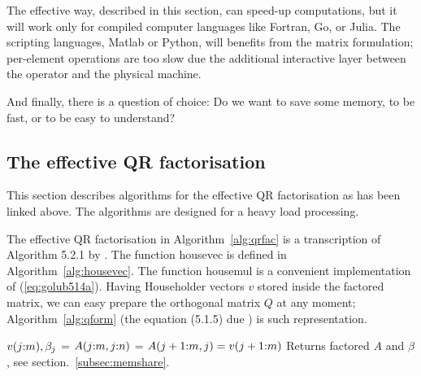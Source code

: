 \begin{refsection}
The effective way, described in this section, can speed-up
computations, but it will work only for compiled computer languages
like Fortran, Go, or Julia.
The scripting languages, Matlab or Python,
will benefits from the matrix formulation; per-element
operations are too slow due the additional interactive layer between
the operator and the physical machine.

And finally, there is a question of choice: Do we want to save some memory,
to be fast, or to be easy to understand?


\subsection{The effective QR factorisation}

This section describes algorithms for the effective QR factorisation
as has been linked above. The algorithms are designed for a heavy load
processing.

The effective QR factorisation in Algorithm~\ref{alg:qrfac} is
a transcription of Algorithm 5.2.1 by \cite{golub2013matrix}.
The function \textsf{housevec} is defined in Algorithm~\ref{alg:housevec}.
The function \textsf{housemul} is a convenient implementation
of (\ref{eq:golub514a}).
Having Householder vectors $v$ stored inside the factored matrix,
we can easy prepare the orthogonal matrix $Q$ at any moment;
Algorithm~\ref{alg:qform} (the equation (5.1.5) due \cite{golub2013matrix})
is such representation.

\begin{algorithm}
  \caption{The effective QR factorisation}
  \label{alg:qrfac}
  \begin{algorithmic}
    \State {}
    \State {}
    \State {}
    \State $v(j{:}m), \beta_j$ = 
    \State $A(j{:}m,j{:}n)$ = 
    \State $A(j+1{:}m,j) = v(j+1{:}m)$
    \EndIf
    \EndFor
    \State Returns factored $A$ and $\beta$, see section.~\ref{subsec:memshare}.
    \EndFunction
  \end{algorithmic}
\end{algorithm}



\end{refsection}
